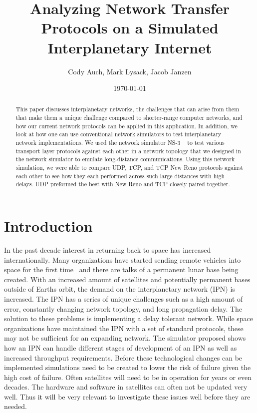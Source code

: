 \documentclass[a4paper,12pt]{article}
\title{Analyzing Network Transfer Protocols on a Simulated Interplanetary Internet}
\author{Cody Auch, Mark Lysack, Jacob Janzen}
\date{\today}
\begin{document}
\maketitle

\begin{abstract}
  This paper discusses interplanetary networks, the challenges that can arise
  from them that make them a unique challenge compared to shorter-range computer
  networks, and how our current network protocols can be applied in this application. In
  addition, we look at how one can use conventional network simulators to test
  interplanetary network implementations. We used the network simulator
  NS-3 ~\cite{ns-3} to test various transport layer protocols against each other
  in a network topology that we designed in the network simulator to emulate
  long-distance communications. Using this network simulation, we were able to
  compare UDP, TCP, and TCP New Reno protocols against each other to see how
  they each performed across such large distances with high delays. UDP preformed the 
  best with New Reno and TCP closely paired together.
\end{abstract}

\section{Introduction}

In the past decade interest in returning back to space has increased
internationally. Many organizations have started sending remote vehicles into
space for the first time~%
and there are talks of a permanent lunar base being created. With an increased
amount of satellites and potentially permanent bases outside of Earths orbit,
the demand on the interplanetary network (IPN) is increased. The IPN has a
series of unique challenges such as a high amount of error, constantly changing
network topology, and long propagation delay. The solution to these problems is
implementing a delay tolerant network. While space organizations have maintained
the IPN with a set of standard protocols, these may not be sufficient for an
expanding network. The simulator proposed shows how an IPN can handle different
stages of development of an IPN as well as increased throughput requirements.
Before these technological changes can be implemented simulations need to be
created to lower the risk of failure given the high cost of failure. Often
satellites will need to be in operation for years or even decades. The hardware
and software in satellites can often not be updated very well. Thus it will be
very relevant to investigate these issues well before they are needed.
\end{document}
